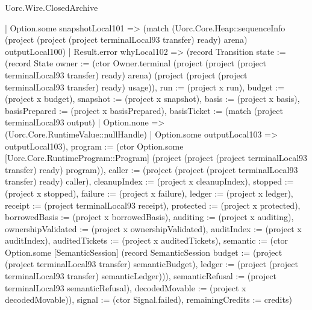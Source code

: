 \begin{lexlean}{Uorc.Wire.ClosedArchive}
\begin{semanticmodule}
{              | Option.some snapshotLocal101 => (match (Uorc.Core.Heap::sequenceInfo (project (project (project terminalLocal93 transfer) ready) arena) outputLocal100)
                | Result.error whyLocal102 => (record Transition {state := (record State {owner := (ctor Owner.terminal (project (project (project terminalLocal93 transfer) ready) arena) (project (project (project terminalLocal93 transfer) ready) usage)), run := (project x run), budget := (project x budget), snapshot := (project x snapshot), basis := (project x basis), basisPrepared := (project x basisPrepared), basisTicket := (match (project terminalLocal93 output)
                  | Option.none => (Uorc.Core.RuntimeValue::nullHandle)
                  | Option.some outputLocal103 => outputLocal103), program := (ctor Option.some [Uorc.Core.RuntimeProgram::Program] (project (project (project terminalLocal93 transfer) ready) program)), caller := (project (project (project terminalLocal93 transfer) ready) caller), cleanupIndex := (project x cleanupIndex), stopped := (project x stopped), failure := (project x failure), ledger := (project x ledger), receipt := (project terminalLocal93 receipt), protected := (project x protected), borrowedBasis := (project x borrowedBasis), auditing := (project x auditing), ownershipValidated := (project x ownershipValidated), auditIndex := (project x auditIndex), auditedTickets := (project x auditedTickets), semantic := (ctor Option.some [SemanticSession] (record SemanticSession {budget := (project (project terminalLocal93 transfer) semanticBudget), ledger := (project (project terminalLocal93 transfer) semanticLedger)})), semanticRefusal := (project terminalLocal93 semanticRefusal), decodedMovable := (project x decodedMovable)}), signal := (ctor Signal.failed), remainingCredits := credits})
}
\end{semanticmodule}
\end{lexlean}
